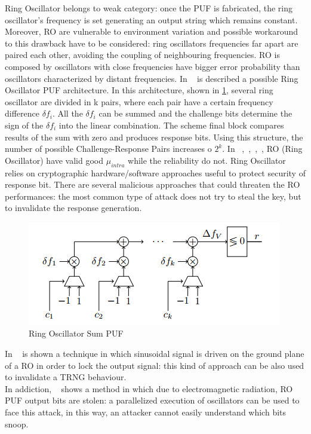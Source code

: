 \documentclass[../tesi.tex]{subfiles}
\begin{document}
Ring Oscillator belongs to weak \puf{} category: once the PUF is fabricated, the ring oscillator's frequency is set generating an output string which remains constant. Moreover, RO \puf{} are vulnerable to environment variation and possible workaround to this drawback have to be considered: ring oscillators frequencies far apart are paired each other, avoiding the coupling of neighbouring frequencies.
RO \puf{} is composed by oscillators with close frequencies have bigger error probability than oscillators characterized by distant frequencies.
In ~\cite{yu2010recombination} is described a possible Ring Oscillator PUF architecture. In this architecture, shown in \ref{fig:ringoscillatorsumpuf}, several ring oscillator are divided in k pairs, where each pair have a certain frequency difference $\delta f_{i}$. All the $\delta f_{i}$ can be summed and the challenge bits determine the sign of the $\delta f_{i}$ into the linear combination. The scheme final block compares results of the sum with zero and produces response bits. Using this structure, the number of possible Challenge-Response Pairs increases o $2^{k}$. In ~\cite{maiti2010large},~\cite{maiti2011improved},~\cite{komurcu2013ring},~\cite{feitenanalysis}, RO (Ring Oscillator)  have valid good $\mu_{intra}$ while the reliability do not. 
Ring Oscillator  relies on cryptographic hardware/software approaches useful to protect security of response bit. There are several malicious approaches that could threaten the RO \puf{} performances: the most common type of attack does not try to steal the key, but to invalidate the response generation. 
\begin{figure}
\centering
\includegraphics[scale=0.65]{images/ringoscillatorsumpuf.png}
\caption{Ring Oscillator Sum PUF}
\label{fig:ringoscillatorsumpuf}
\end{figure}
In ~\cite{markettos2009frequency} is shown a technique in which sinusoidal signal is driven on the ground plane of a RO in order to lock the output signal: this kind of approach can be also used to invalidate a TRNG behaviour. \\
In addiction, ~\cite{merli2011semi} shows a method in which due to electromagnetic radiation, RO PUF output bits are stolen: a parallelized execution of oscillators can be used to face this attack, in this way, an attacker cannot easily understand which bits snoop.
\end{document}
